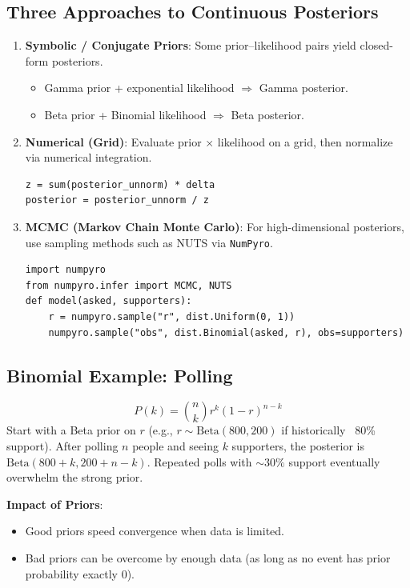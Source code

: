 \documentclass[11pt]{article}
\begin{document}
\subsection{Three Approaches to Continuous Posteriors}

\begin{enumerate}
  \item \textbf{Symbolic / Conjugate Priors}: Some prior--likelihood pairs yield closed-form posteriors.
    \begin{itemize}
      \item Gamma prior + exponential likelihood $\Rightarrow$ Gamma posterior.
      \item Beta prior + Binomial likelihood $\Rightarrow$ Beta posterior.
    \end{itemize}
  \item \textbf{Numerical (Grid)}: Evaluate prior $\times$ likelihood on a grid, then normalize via numerical integration.
    \begin{lstlisting}
z = sum(posterior_unnorm) * delta
posterior = posterior_unnorm / z
    \end{lstlisting}
  \item \textbf{MCMC (Markov Chain Monte Carlo)}: For high-dimensional posteriors, use sampling methods such as NUTS via \texttt{NumPyro}.
    \begin{lstlisting}
import numpyro
from numpyro.infer import MCMC, NUTS
def model(asked, supporters):
    r = numpyro.sample("r", dist.Uniform(0, 1))
    numpyro.sample("obs", dist.Binomial(asked, r), obs=supporters)
    \end{lstlisting}
\end{enumerate}

\subsection{Binomial Example: Polling}
\[
  P(k) = \binom{n}{k} r^k (1-r)^{n-k}
\]
Start with a Beta prior on $r$ (e.g., $r \sim \text{Beta}(800, 200)$ if historically ~80\% support). After polling $n$ people and seeing $k$ supporters, the posterior is $\text{Beta}(800+k, 200+n-k)$. Repeated polls with $\sim30\%$ support eventually overwhelm the strong prior.

\textbf{Impact of Priors}:
\begin{itemize}
  \item Good priors speed convergence when data is limited.
  \item Bad priors can be overcome by enough data (as long as no event has prior probability exactly 0).
\end{itemize}
\end{document}
